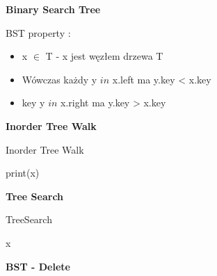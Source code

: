 \documentclass{article}
\begin{document}
    \newpage
    \vspace{1\baselineskip}
    \textbf{Binary Search Tree} \par
    BST property : \par
    \begin{itemize}
        \item x $\in$ T - x jest węzłem drzewa T
        \item Wówczas każdy y $in$ x.left ma y.key < x.key
        \item key y $in$ x.right ma y.key > x.key
    \end{itemize}
    \vspace{1\baselineskip}
    \textbf{Inorder Tree Walk} \par
    \begin{algorithm}[H]
        \caption{Inorder Tree Walk}\label{alg:inorder_tree_walk}
        \begin{algorithmic}[1]
                \State {}
                \State print(x)
                \State {}
            \EndIf
        \EndProcedure
        \end{algorithmic}
    \end{algorithm}
    \newpage
    \textbf{Tree Search} \par
    \begin{algorithm}[H]
        \caption{TreeSearch}\label{alg:tree_search}
        \begin{algorithmic}[1]
                \State \Return x
                \State \Return {}
            \Else
                \State \Return {}
            \EndIf
        \EndProcedure
        \end{algorithmic}
    \end{algorithm}
    \vspace{1\baselineskip}
    \textbf{BST - Delete} \par
\end{document}
